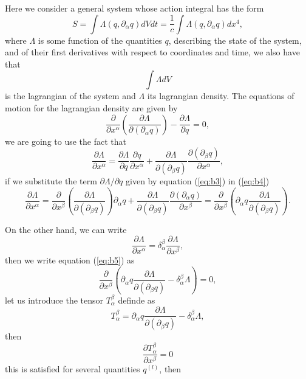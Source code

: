 \begin{appendix}
Here we consider a general system whose action integral has the form
\[
S=\int\Lambda\left(q,\partial_{\alpha}q\right)dVdt=\frac{1}{c}\int\Lambda\left(q,\partial_{\alpha}q\right)dx^{4},
\]
where $\Lambda$ is some function of the quantities $q$, describing
the state of the system, and of their first derivatives with respect
to coordinates and time, we also have that
\[
\int\Lambda dV
\]
is the lagrangian of the system and $\Lambda$ its lagrangian density.
The equations of motion for the lagrangian density are given by
\begin{equation}
\frac{\partial}{\partial x^{\alpha}}\left(\frac{\partial\Lambda}{\partial\left(\partial_{\alpha}q\right)}\right)-\frac{\partial\Lambda}{\partial q}=0,\label{eq:b3}
\end{equation}
we are going to use the fact that
\begin{equation}
\frac{\partial\Lambda}{\partial x^{\alpha}}=\frac{\partial\Lambda}{\partial q}\frac{\partial q}{\partial x^{\alpha}}+\frac{\partial\Lambda}{\partial\left(\partial_{\beta}q\right)}\frac{\partial\left(\partial_{\beta}q\right)}{\partial x^{\alpha}},\label{eq:b4}
\end{equation}
if we substitute the term $\partial\Lambda/\partial q$ given by equation
(\ref{eq:b3}) in (\ref{eq:b4})
\begin{equation}
\frac{\partial\Lambda}{\partial x^{\alpha}}=\frac{\partial}{\partial x^{\beta}}\left(\frac{\partial\Lambda}{\partial\left(\partial_{\beta}q\right)}\right)\partial_{\alpha}q+\frac{\partial\Lambda}{\partial\left(\partial_{\beta}q\right)}\frac{\partial\left(\partial_{\alpha}q\right)}{\partial x^{\beta}}=\frac{\partial}{\partial x^{\beta}}\left(\partial_{\alpha}q\frac{\partial\Lambda}{\partial\left(\partial_{\beta}q\right)}\right).\label{eq:b5}
\end{equation}

On the other hand, we can write
\[
\frac{\partial\Lambda}{\partial x^{\alpha}}=\delta_{\alpha}^{\beta}\frac{\partial\Lambda}{\partial x^{\beta}},
\]
then we write equation (\ref{eq:b5}) as
\[
\frac{\partial}{\partial x^{\beta}}\left(\partial_{\alpha}q\frac{\partial\Lambda}{\partial\left(\partial_{\beta}q\right)}-\delta_{\alpha}^{\beta}\Lambda\right)=0,
\]
let us introduce the tensor $T_{\alpha}^{\beta}$ definde as
\[
T_{\alpha}^{\beta}=\partial_{\alpha}q\frac{\partial\Lambda}{\partial\left(\partial_{\beta}q\right)}-\delta_{\alpha}^{\beta}\Lambda,
\]
then
\[
\frac{\partial T_{\alpha}^{\beta}}{\partial x^{\beta}}=0
\]
this is satisfied for several quantities $q^{(l)}$, then


\end{appendix}
